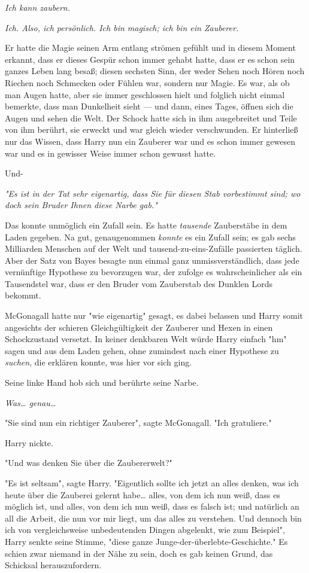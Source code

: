 {\emph{Ich kann zaubern.}

\emph{Ich. Also, ich persönlich. Ich bin magisch; ich bin ein Zauberer.}

Er hatte die Magie seinen Arm entlang strömen gefühlt und in diesem Moment erkannt, dass er dieses Gespür schon immer gehabt hatte, dass er es schon sein ganzes Leben lang besaß; diesen sechsten Sinn, der weder Sehen noch Hören noch Riechen noch Schmecken oder Fühlen war, sondern nur Magie. Es war, als ob man Augen hatte, aber sie immer geschlossen hielt und folglich nicht einmal bemerkte, dass man Dunkelheit sieht --- und dann, eines Tages, öffnen sich die Augen und sehen die Welt. Der Schock hatte sich in ihm ausgebreitet und Teile von ihm berührt, sie erweckt und war gleich wieder verschwunden. Er hinterließ nur das Wissen, dass Harry nun ein Zauberer war und es schon immer gewesen war und es in gewisser Weise immer schon gewusst hatte.

Und-

\emph{"Es ist in der Tat sehr eigenartig, dass Sie für diesen Stab vorbestimmt sind; wo doch sein Bruder Ihnen diese Narbe gab."}

Das konnte unmöglich ein Zufall sein. Es hatte \emph{tausende} Zauberstäbe in dem Laden gegeben. Na gut, genaugenommen \emph{konnte} es ein Zufall sein; es gab sechs Milliarden Menschen auf der Welt und tausend-zu-eins-Zufälle passierten täglich. Aber der Satz von Bayes besagte nun einmal ganz unmissverständlich, dass jede vernünftige Hypothese zu bevorzugen war, der zufolge es wahrscheinlicher als ein Tausendstel war, dass er den Bruder vom Zauberstab des Dunklen Lords bekommt.

McGonagall hatte nur "wie eigenartig" gesagt, es dabei belassen und Harry somit angesichts der schieren Gleichgültigkeit der Zauberer und Hexen in einen Schockzustand versetzt. In keiner denkbaren Welt würde Harry einfach "hm" sagen und aus dem Laden gehen, ohne zumindest nach einer Hypothese zu \emph{suchen}, die erklären konnte, was hier vor sich ging.

Seine linke Hand hob sich und berührte seine Narbe.

\emph{Was… genau…}

"Sie sind nun ein richtiger Zauberer", sagte McGonagall. "Ich gratuliere."

Harry nickte.

"Und was denken Sie über die Zaubererwelt?"

"Es ist seltsam", sagte Harry. "Eigentlich sollte ich jetzt an alles denken, was ich heute über die Zauberei gelernt habe… alles, von dem ich nun weiß, dass es möglich ist, und alles, von dem ich nun weiß, dass es falsch ist; und natürlich an all die Arbeit, die nun vor mir liegt, um das alles zu verstehen. Und dennoch bin ich von vergleichsweise unbedeutenden Dingen abgelenkt, wie zum Beispiel", Harry senkte seine Stimme, "diese ganze Junge-der-überlebte-Geschichte." Es schien zwar niemand in der Nähe zu sein, doch es gab keinen Grund, das Schicksal herauszufordern.

}
